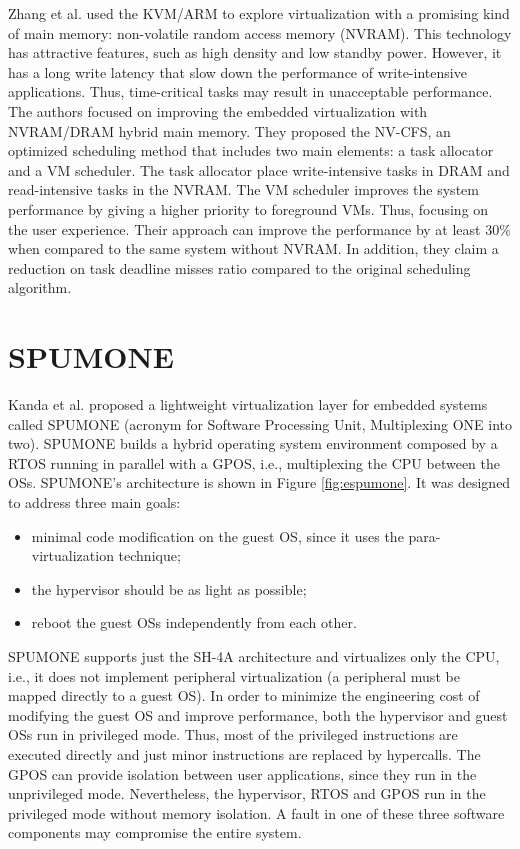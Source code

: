 Zhang et al. \cite{Dan2015} used the KVM/ARM to explore virtualization with a promising kind of main memory: non-volatile random access memory (NVRAM). This technology has attractive features, such as high density and low standby power. However, it has a long write latency that slow down the performance of write-intensive applications. Thus, time-critical tasks may result in unacceptable performance. The authors focused on improving the embedded virtualization with NVRAM/DRAM hybrid main memory. They proposed the NV-CFS, an optimized scheduling method that includes two main elements: a task allocator and a VM scheduler. The task allocator place write-intensive tasks in DRAM and read-intensive tasks in the NVRAM. The VM scheduler improves the system performance by giving a higher priority to foreground VMs. Thus, focusing on the user experience. Their approach can improve the performance by at least 30\% when compared to the same system without NVRAM. In addition, they claim a reduction on task deadline misses ratio compared to the original scheduling algorithm. 


\section{SPUMONE}
\label{section:spumone}

Kanda et al. \cite{spumone2008} proposed a lightweight virtualization layer for embedded systems called SPUMONE (acronym for Software Processing Unit, Multiplexing ONE into two). SPUMONE builds a hybrid operating system environment composed by a RTOS running in parallel with a GPOS, i.e., multiplexing the CPU between the OSs. SPUMONE's architecture is shown in Figure \ref{fig:espumone}. It was designed to address three main goals:

\begin{itemize}
\item minimal code modification on the guest OS, since it uses the para-virtualization technique;  
\item the hypervisor should be as light as possible; 
\item reboot the guest OSs independently from each other. 
\end{itemize}

SPUMONE supports just the SH-4A \cite{sh4a} architecture and virtualizes only the CPU, i.e., it does not implement peripheral virtualization (a peripheral must be mapped directly to a guest OS). In order to minimize the engineering cost of modifying the guest OS and improve performance, both the hypervisor and guest OSs run in privileged mode. Thus, most of the privileged instructions are executed directly and just minor instructions are replaced by hypercalls. The GPOS can provide isolation between user applications, since they run in the unprivileged mode. Nevertheless, the hypervisor, RTOS and GPOS run in the privileged mode without memory isolation. A fault in one of these three software components may compromise the entire system. 

